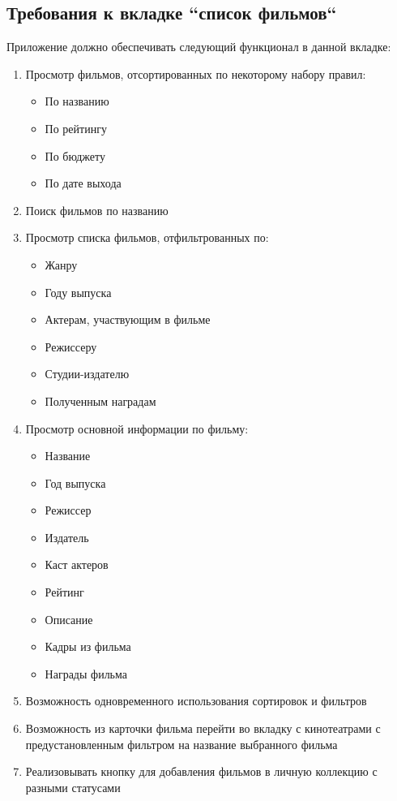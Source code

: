 \documentclass[a4paper,16pt]{article}
\begin{document}
\subsection{Требования к вкладке ``список фильмов``}
Приложение должно обеспечивать следующий функционал в данной вкладке:
\begin{enumerate}
    \item Просмотр фильмов, отсортированных по некоторому набору правил:
    \begin{itemize}
        \item По названию
        \item По рейтингу
        \item По бюджету
        \item По дате выхода
    \end{itemize}
    \item Поиск фильмов по названию
    \item Просмотр списка фильмов, отфильтрованных по:
    \begin{itemize}
        \item Жанру
        \item Году выпуска
        \item Актерам, участвующим в фильме
        \item Режиссеру
        \item Студии-издателю
        \item Полученным наградам
    \end{itemize}
    \item Просмотр основной информации по фильму:
    \begin{itemize}
        \item Название
        \item Год выпуска
        \item Режиссер
        \item Издатель
        \item Каст актеров
        \item Рейтинг
        \item Описание
        \item Кадры из фильма
        \item Награды фильма
    \end{itemize}
    \item Возможность одновременного использования сортировок и фильтров
    \item Возможность из карточки фильма перейти во вкладку с кинотеатрами с предустановленным фильтром на название выбранного фильма
    \item Реализовывать кнопку для добавления фильмов в личную коллекцию с разными статусами
\end{enumerate}
\end{document}
